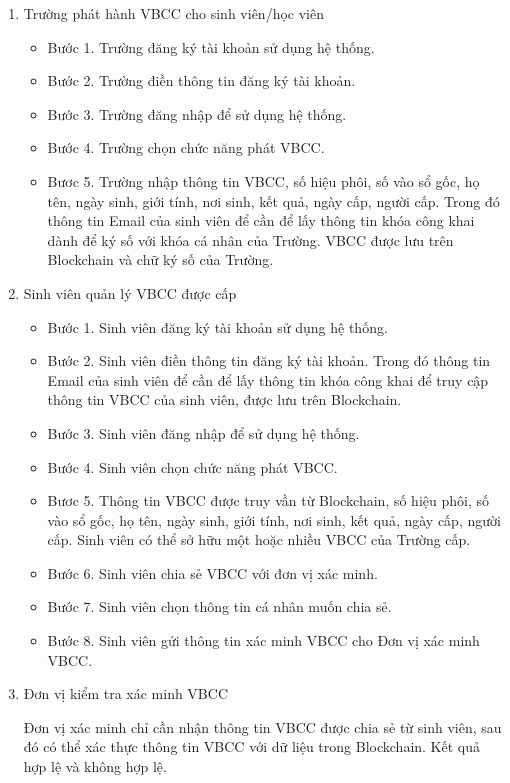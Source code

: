 \begin{enumerate}
\item Trường phát hành VBCC cho sinh viên/học viên

	\begin{itemize}
		\item 
	Bước 1. Trường đăng ký tài khoản sử dụng hệ thống.
\item 
		Bước 2. Trường điền thông tin đăng ký tài khoản.
	\item
		Bước 3. Trường đăng nhập để sử dụng hệ thống.
	\item 
		Bước 4. Trường chọn chức năng phát VBCC.
	\item
		Bươc 5. Trường nhập thông tin VBCC, số hiệu phôi, số vào sổ gốc, họ tên, ngày sinh, giới tính, nơi sinh, kết quả, ngày cấp, người cấp.
		Trong đó thông tin Email của sinh viên để cần để lấy thông tin khóa công khai dành để ký số với khóa cá nhân của Trường. VBCC được lưu trên Blockchain và chữ ký số của Trường.
	\end{itemize}
\item Sinh viên quản lý VBCC được cấp

	\begin{itemize}
		\item 
	Bước 1. Sinh viên đăng ký tài khoản sử dụng hệ thống.
\item 
		Bước 2. Sinh viên điền thông tin đăng ký tài khoản.
		Trong đó thông tin Email của sinh viên để cần để lấy thông tin khóa công khai để truy cập thông tin VBCC của sinh viên, được lưu trên Blockchain.
	\item
		Bước 3. Sinh viên  đăng nhập để sử dụng hệ thống.
	\item 
		Bước 4. Sinh viên chọn chức năng phát VBCC.
	\item
		Bươc 5. Thông tin VBCC được truy vần từ Blockchain, số hiệu phôi, số vào sổ gốc, họ tên, ngày sinh, giới tính, nơi sinh, kết quả, ngày cấp, người cấp. 
Sinh viên có thể sở hữu một hoặc nhiều VBCC của Trường cấp. 
	\item Bước 6. Sinh viên chia sẻ VBCC với đơn vị xác minh. 
	\item Bước 7. Sinh viên chọn thông tin cá nhân muốn chia sẻ.
	\item Bước 8. Sinh viên gửi thông tin xác minh VBCC cho Đơn vị xác minh VBCC.
	\end{itemize}
\item Đơn vị kiểm tra xác minh VBCC

Đơn vị xác minh chỉ cần nhận thông tin VBCC được chia sẻ từ sinh viên, sau đó có thể xác thực thông tin VBCC với dữ liệu trong Blockchain. Kết quả hợp lệ và không hợp lệ.

\end{enumerate}
